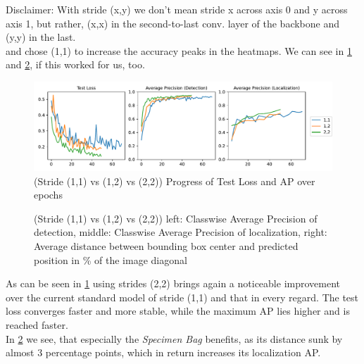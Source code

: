 Disclaimer: With stride (x,y) we don't mean stride x across axis 0 and y across axis 1, but rather, (x,x) in the second-to-last conv. layer of the backbone and (y,y) in the last.\\

\cite{Vardazaryan} and \cite{lstm} chose (1,1) to increase the accuracy peaks in the heatmaps. We can see in \ref{fig:strides_aps} and \ref{fig:strides_distances}, if this worked for us, too.

\begin{figure}[h]
	\centering
	\includegraphics[width=15cm]{4_experiments/images/1_stride_exp/APs.pdf}
	\caption{(Stride (1,1) vs (1,2) vs (2,2)) Progress of Test Loss and AP over epochs}
	\label{fig:strides_aps}
\end{figure}

\begin{figure}[h]
	\centering
	\caption{(Stride (1,1) vs (1,2) vs (2,2)) left: Classwise Average Precision of detection, middle: Classwise Average Precision of localization, right: Average distance between bounding box center and predicted position in \% of the image diagonal}
	\label{fig:strides_distances}
\end{figure}

As can be seen in \ref{fig:strides_aps} using strides (2,2) brings again a noticeable improvement over the current standard model of stride (1,1) and that in every regard. The test loss converges faster and more stable, while the maximum AP lies higher and is reached faster.\\
In \ref{fig:strides_distances} we see, that especially the \emph{Specimen Bag} benefits, as its distance sunk by almost 3 percentage points, which in return increases its localization AP. 

